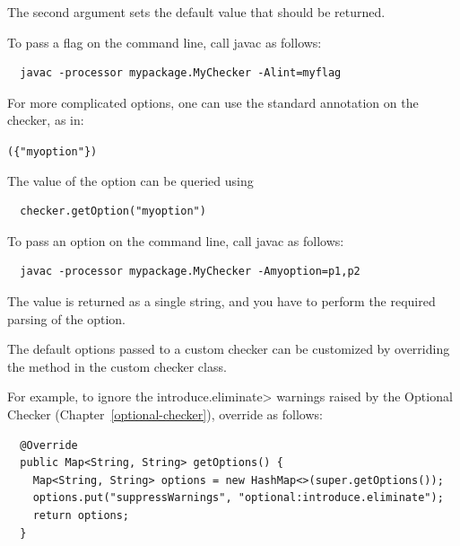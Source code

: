 The second argument sets the default value that should be returned.

To pass a flag on the command line, call javac as follows:

\begin{Verbatim}
  javac -processor mypackage.MyChecker -Alint=myflag
\end{Verbatim}



For more complicated options, one can use the standard
 annotation on the checker, as in:

\begin{alltt}
  (\{"myoption"\})
\end{alltt}

The value of the option can be queried using

\begin{Verbatim}
  checker.getOption("myoption")
\end{Verbatim}

To pass an option on the command line, call javac as follows:

\begin{Verbatim}
  javac -processor mypackage.MyChecker -Amyoption=p1,p2
\end{Verbatim}

The value is returned as a single string, and you have to perform the
required parsing of the option.


The default options passed to a custom checker can be customized by overriding the
 method in the
custom checker class.

For example, to ignore the \<introduce.eliminate> warnings raised by the
Optional Checker (Chapter~\ref{optional-checker}), override
 as follows:

\begin{Verbatim}
  @Override
  public Map<String, String> getOptions() {
    Map<String, String> options = new HashMap<>(super.getOptions());
    options.put("suppressWarnings", "optional:introduce.eliminate");
    return options;
  }
\end{Verbatim}

